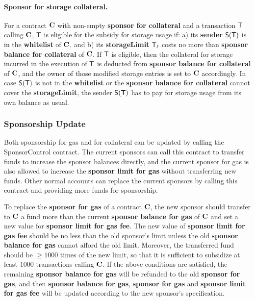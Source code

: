 \paragraph{Sponsor for storage collateral.}
For a contract $\mathbf{C}$ with non-empty {\bf sponsor for collateral} and a transaction $\textsf{T}$ calling $\mathbf{C}$,
$\textsf{T}$ is eligible for the subsidy for storage usage if: 
a) its {\bf sender} $\mathsf{S}{\left({\textsf{T}} \right)}$ is in the \textbf{whitelist} of $\mathbf{C}$, and 
b) its {\bf storageLimit} $\textsf{T}_\ell$ costs no more than {\bf sponsor balance for collateral} of $\mathbf{C}$. 
If $\textsf{T}$ is eligible, then the collateral for storage incurred in the execution of $\textsf{T}$ 
is deducted from \textbf{sponsor balance for collateral} of $\mathbf{C}$, 
and the owner of those modified storage entries is set to $\mathbf{C}$ accordingly.
In case $\mathsf{S}{\left({\textsf{T}} \right)}$ is not in the \textbf{whitelist} or the \textbf{sponsor balance for collateral} cannot cover the {\bf storageLimit}, the sender $\mathsf{S}{\left({\textsf{T}} \right)}$ has to pay for storage usage from its own balance as usual.


\subsubsection{Sponsorship Update}

Both sponsorship for gas and for collateral can be updated by calling the SponsorControl contract.
The current sponsors can call this contract to transfer funds to increase the sponsor balances directly,
and the current sponsor for gas is also allowed to increase the \textbf{sponsor limit for gas} without transferring new funds.
Other normal accounts can replace the current sponsors by calling this contract and providing more funds for sponsorship.



To replace the \textbf{sponsor for gas} of a contract $\mathbf{C}$, the new sponsor should transfer to $\mathbf{C}$ a fund more than the current \textbf{sponsor balance for gas} of $\mathbf{C}$ and set a new value for \textbf{sponsor limit for gas fee}.
The new value of \textbf{sponsor limit for gas fee} should be no less than the old sponsor's limit  
unless the old \textbf{sponsor balance for gas} cannot afford the old limit.
Moreover, the transferred fund should be $\ge 1000$ times of the new limit, so that it is sufficient to subsidize at least $1000$  transactions calling $\mathbf{C}$. 
If the above conditions are satisfied, the remaining \textbf{sponsor balance for gas} will be refunded to the old \textbf{sponsor for gas},
and then \textbf{sponsor balance for gas}, \textbf{sponsor for gas} and \textbf{sponsor limit for gas fee} will be updated according to the new sponsor's specification.


